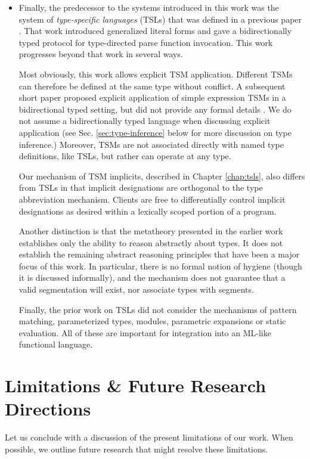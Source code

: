 \begin{itemize}
\item Finally, the predecessor to the systems introduced in this work was the system of \emph{type-specific languages} (TSLs) that was defined in a previous paper \cite{TSLs}. That work introduced generalized literal forms and gave a bidirectionally typed protocol for type-directed parse function invocation. This work progresses beyond that work in several ways.

Most obviously, this work allows explicit TSM application. Different TSMs can therefore be defined at the same type without conflict. A subsequent short paper proposed explicit application of simple expression TSMs in a bidirectional typed setting, but did not provide any formal details \cite{sac15}. We do not assume a bidirectionally typed language when discussing explicit application (see Sec. \ref{sec:type-inference} below for more discussion on type inference.) 
Moreover, TSMs are not associated directly with named type definitions, like TSLs,  but rather can operate at any type.  

Our mechanism of TSM implicits, described in Chapter \ref{chap:tsls}, also differs from TSLs in that implicit designations are orthogonal to the type abbreviation mechanism. Clients are free to differentially control implicit designations as desired within a lexically scoped portion of a program.

Another distinction is that the metatheory presented in the earlier work establishes only the ability to reason abstractly about types. It does not establish the remaining abstract reasoning principles that have been a major focus of this work. In particular, there is no formal notion of hygiene (though it is discussed informally), and the mechanism does not guarantee that a valid segmentation will exist, nor associate types with segments.

Finally, the prior work on TSLs did not consider the mechanisms of pattern matching, parameterized types, modules, parametric expansions or static evaluation. All of these are important for integration into an ML-like functional language.

\end{itemize}

\vspace{-8px}
\section{Limitations \& Future Research Directions}\label{sec:future-work}
Let us conclude with a discussion of the present limitations of our work. When possible, we outline future research that might resolve these limitations.


